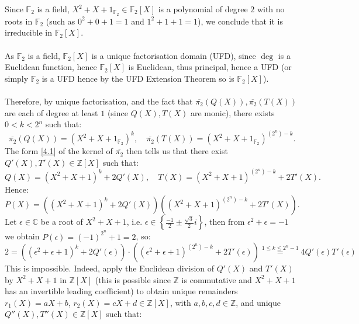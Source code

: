 \begin{solution}
\[    \]
    Since \( \mathbb{F}_2 \) is a field, \( X^2 + X + 1_{\mathbb{F}_2} \in \mathbb{F}_2\left[X\right] \) is a polynomial of degree \( 2 \) with no roots in \( \mathbb{F}_2 \) (such as \( 0^2 + 0 + 1 = 1 \) and \( 1^2 + 1 + 1 = 1 \)), we conclude that it is irreducible in \( \mathbb{F}_2\left[X\right] \).
    \\\\
    As \( \mathbb{F}_2 \) is a field, \( \mathbb{F}_2\left[X\right] \) is a unique factorisation domain (UFD), since \( \deg \) is a Euclidean function, hence \( \mathbb{F}_2\left[X\right] \) is Euclidean, thus principal, hence a UFD (or simply \( \mathbb{F}_2 \) is a UFD hence by the UFD Extension Theorem so is \( \mathbb{F}_2\left[X\right] \)).
    \\\\
    Therefore, by unique factorisation, and the fact that \( \overline{\pi_2}\left( Q\left(X\right) \right), \overline{\pi_2}\left( T\left(X\right) \right) \) are each of degree at least \( 1 \) (since \( Q\left(X\right), T\left(X\right) \) are monic), there exists \( 0< k < 2^n \) such that:
    \[
        \overline{\pi_2}\left(Q\left(X\right)\right) = \left( X^2 + X + 1_{\mathbb{F}_2} \right)^k, \quad \overline{\pi_2}\left(T\left(X\right)\right) = \left( X^2 + X + 1_{\mathbb{F}_2} \right)^{\left(2^n\right) - k}.
    \]
    The form \eqref{4.1} of the kernel of \( \overline{\pi_2} \) then tells us that there exist \( Q'\left(X\right), T'\left(X\right) \in \mathbb{Z}\left[X\right] \) such that:
    \[
        Q\left(X\right) = \left( X^2 + X + 1 \right)^k + 2Q'\left(X\right), \quad T\left(X\right) = \left( X^2 + X + 1 \right)^{\left(2^n\right) - k} + 2T'\left(X\right).
    \]
    Hence:
    \[
        P\left(X\right) = \left( \left( X^2 + X + 1 \right)^k + 2Q'\left(X\right) \right) \left( \left( X^2 + X + 1 \right)^{\left(2^n\right) - k} + 2T'\left(X\right) \right).
    \]
    Let \( \epsilon \in \mathbb{C} \) be a root of \( X^2 + X + 1 \), i.e. \( \epsilon \in \left\{ \frac{-1}{2} \pm \frac{\sqrt{3}}{2}i \right\} \), then from \( \epsilon^2+\epsilon=-1 \) we obtain \( P\left(\epsilon\right) = \left(-1\right)^{2^n} + 1 = 2 \), so:
    \[
        2 = \left(\left( \epsilon^2 + \epsilon + 1 \right)^k + 2Q'\left(\epsilon\right)\right) \cdot \left(\left( \epsilon^2 + \epsilon + 1 \right)^{\left(2^n\right) - k} + 2T'\left(\epsilon\right)\right) \overset{1\leq k\leq 2^n-1}{=} 4 Q'\left(\epsilon\right) T'\left(\epsilon\right)
    \]
    This is impossible. Indeed, apply the Euclidean division of \( Q'\left(X\right) \) and \( T'\left(X\right) \) by \( X^2 + X + 1 \) in \( \mathbb{Z}\left[X\right] \) (this is possible since \( \mathbb{Z} \) is commutative and \( X^2 + X + 1 \) has an invertible leading coefficient) to obtain unique remainders \( r_1\left(X\right) = aX + b \), \( r_2\left(X\right) = cX + d \in \mathbb{Z}\left[X\right] \), with \( a, b, c, d \in \mathbb{Z} \), and unique \( Q''\left(X\right), T''\left(X\right) \in \mathbb{Z}\left[X\right] \) such that:

\end{solution}
